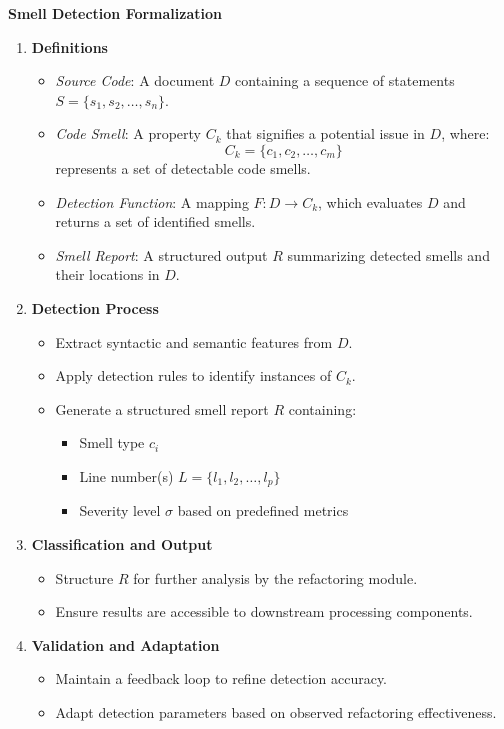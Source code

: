 \documentclass[12pt, titlepage]{article}
\begin{document}
\textbf{Smell Detection Formalization}
\begin{enumerate}
  \item \textbf{Definitions}
  \begin{itemize}
      \item \textit{Source Code}: A document \( D \) containing a sequence of statements \( S = \{ s_1, s_2, \dots, s_n \} \).
      \item \textit{Code Smell}: A property \( C_k \) that signifies a potential issue in \( D \), where:
      \[
      C_k = \{ c_1, c_2, \dots, c_m \}
      \]
      represents a set of detectable code smells.
      \item \textit{Detection Function}: A mapping \( F: D \to C_k \), which evaluates \( D \) and returns a set of identified smells.
      \item \textit{Smell Report}: A structured output \( R \) summarizing detected smells and their locations in \( D \).
  \end{itemize}

  \item \textbf{Detection Process}
  \begin{itemize}
      \item Extract syntactic and semantic features from \( D \).
      \item Apply detection rules to identify instances of \( C_k \).
      \item Generate a structured smell report \( R \) containing:
      \begin{itemize}
          \item Smell type \( c_i \)
          \item Line number(s) \( L = \{ l_1, l_2, \dots, l_p \} \)
          \item Severity level \( \sigma \) based on predefined metrics
      \end{itemize}
  \end{itemize}

  \item \textbf{Classification and Output}
  \begin{itemize}
      \item Structure \( R \) for further analysis by the refactoring module.
      \item Ensure results are accessible to downstream processing components.
  \end{itemize}

  \item \textbf{Validation and Adaptation}
  \begin{itemize}
      \item Maintain a feedback loop to refine detection accuracy.
      \item Adapt detection parameters based on observed refactoring effectiveness.
  \end{itemize}
\end{enumerate}
\end{document}
